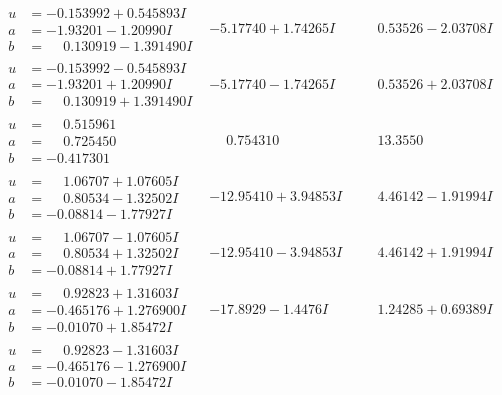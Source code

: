 \documentclass[1p]{elsarticle_modified}
\theoremstyle{definition}
\begin{document}
$$\begin{array}{c|c|c}
\begin{aligned}
u &= -0.153992 + 0.545893 I \\
a &= -1.93201 - 1.20990 I \\
b &= \phantom{-}0.130919 - 1.391490 I\end{aligned}
 & -5.17740 + 1.74265 I & \phantom{-}0.53526 - 2.03708 I \\ \hline\begin{aligned}
u &= -0.153992 - 0.545893 I \\
a &= -1.93201 + 1.20990 I \\
b &= \phantom{-}0.130919 + 1.391490 I\end{aligned}
 & -5.17740 - 1.74265 I & \phantom{-}0.53526 + 2.03708 I \\ \hline\begin{aligned}
u &= \phantom{-}0.515961\phantom{ +0.000000I} \\
a &= \phantom{-}0.725450\phantom{ +0.000000I} \\
b &= -0.417301\phantom{ +0.000000I}\end{aligned}
 & \phantom{-}0.754310\phantom{ +0.000000I} & \phantom{-}13.3550\phantom{ +0.000000I} \\ \hline\begin{aligned}
u &= \phantom{-}1.06707 + 1.07605 I \\
a &= \phantom{-}0.80534 - 1.32502 I \\
b &= -0.08814 - 1.77927 I\end{aligned}
 & -12.95410 + 3.94853 I & \phantom{-}4.46142 - 1.91994 I \\ \hline\begin{aligned}
u &= \phantom{-}1.06707 - 1.07605 I \\
a &= \phantom{-}0.80534 + 1.32502 I \\
b &= -0.08814 + 1.77927 I\end{aligned}
 & -12.95410 - 3.94853 I & \phantom{-}4.46142 + 1.91994 I \\ \hline\begin{aligned}
u &= \phantom{-}0.92823 + 1.31603 I \\
a &= -0.465176 + 1.276900 I \\
b &= -0.01070 + 1.85472 I\end{aligned}
 & -17.8929 - 1.4476 I & \phantom{-}1.24285 + 0.69389 I \\ \hline\begin{aligned}
u &= \phantom{-}0.92823 - 1.31603 I \\
a &= -0.465176 - 1.276900 I \\
b &= -0.01070 - 1.85472 I\end{aligned}

\end{array}$$
\end{document}
